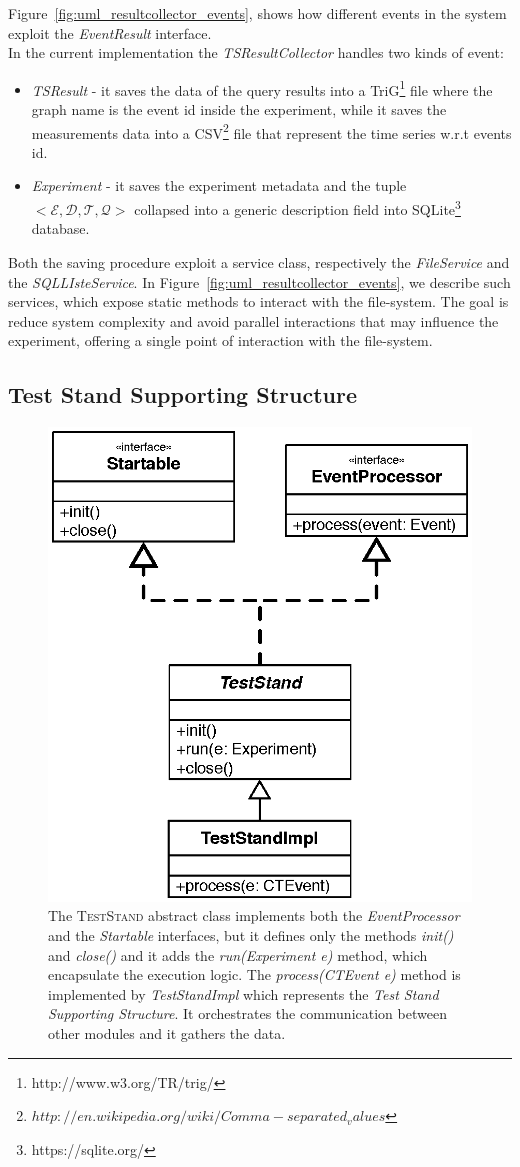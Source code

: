 Figure~\ref{fig:uml_resultcollector_events}, shows how different events in the system exploit the \textit{EventResult} interface.\\ In the current implementation the \textit{TSResultCollector} handles two kinds of event:
\begin{itemize}
\item \textit{TSResult} - it saves the data of the query results into a TriG\footnote{http://www.w3.org/TR/trig/} file where the graph name is the event id inside the experiment, while it saves the measurements data into a CSV\footnote{$http://en.wikipedia.org/wiki/Comma-separated_values$} file that represent the time series w.r.t events id. 
\item \textit{Experiment} - it saves the experiment metadata and the tuple \\ $<\mathcal{E},\mathcal{D},\mathcal{T},\mathcal{Q}>$ collapsed into a generic description field into SQLite\footnote{https://sqlite.org/} database.
\end{itemize} 

Both the saving procedure exploit a service class, respectively the \textit{FileService} and the \textit{SQLLIsteService}. In Figure~\ref{fig:uml_resultcollector_events}, we describe such services, which expose static methods to interact with the file-system. The goal is reduce system complexity and avoid parallel interactions that may influence the experiment, offering a single point of interaction with the file-system. 


\subsection{Test Stand Supporting Structure}\label{sec:teststand-impl}


\begin{figure}[tbh]
  \centering
	\includegraphics[width=0.5\linewidth]{images/uml_teststand}
	\caption[\name \textsc{TestStand} - UML Schema]{The \textsc{TestStand} abstract class implements both the \textit{EventProcessor} and the \textit{Startable} interfaces, but it defines only the methods \textit{init()} and \textit{close()}  and it adds the \textit{run(Experiment e)} method, which encapsulate the execution logic. The \textit{process(CTEvent e)} method is implemented by \textit{TestStandImpl} which represents the \textit{Test Stand Supporting Structure}. It orchestrates the communication between other modules and it gathers the data.}
  	\label{fig:uml_teststand}
\end{figure}



